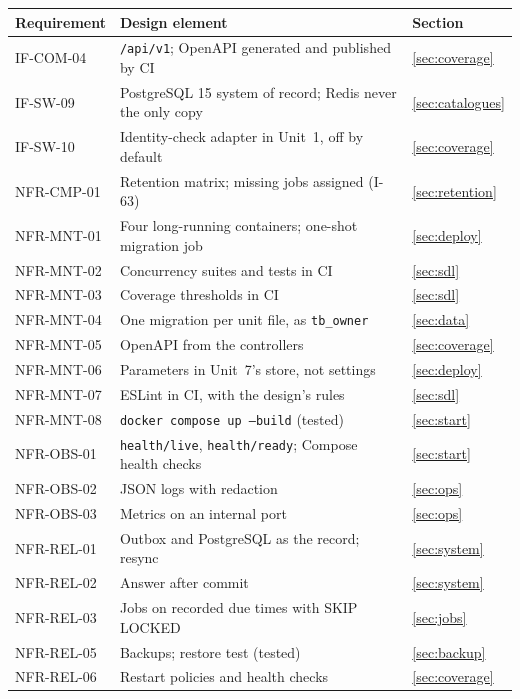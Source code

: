 \documentclass[11pt,a4paper]{article}
\begin{document}
{\small\begin{longtable}{@{}>{\ttfamily}p{2.4cm}>{\raggedright\arraybackslash}p{10.6cm}>{\raggedright\arraybackslash}p{2.2cm}@{}}
\toprule \textnormal{\textbf{Requirement}} & \textbf{Design element} & \textbf{Section} \\ \midrule \endhead
IF-COM-04 & \texttt{/api/v1}; OpenAPI generated and published by CI & \ref{sec:coverage} \\
IF-SW-09 & PostgreSQL 15 system of record; Redis never the only copy & \ref{sec:catalogues} \\
IF-SW-10 & Identity-check adapter in Unit~1, off by default & \ref{sec:coverage} \\
NFR-CMP-01 & Retention matrix; missing jobs assigned (I-63) & \ref{sec:retention} \\
NFR-MNT-01 & Four long-running containers; one-shot migration job & \ref{sec:deploy} \\
NFR-MNT-02 & Concurrency suites and tests in CI & \ref{sec:sdl} \\
NFR-MNT-03 & Coverage thresholds in CI & \ref{sec:sdl} \\
NFR-MNT-04 & One migration per unit file, as \texttt{tb\_owner} & \ref{sec:data} \\
NFR-MNT-05 & OpenAPI from the controllers & \ref{sec:coverage} \\
NFR-MNT-06 & Parameters in Unit~7's store, not settings & \ref{sec:deploy} \\
NFR-MNT-07 & ESLint in CI, with the design's rules & \ref{sec:sdl} \\
NFR-MNT-08 & \texttt{docker compose up --build} (tested) & \ref{sec:start} \\
NFR-OBS-01 & \texttt{health/live}, \texttt{health/ready}; Compose health checks & \ref{sec:start} \\
NFR-OBS-02 & JSON logs with redaction & \ref{sec:ops} \\
NFR-OBS-03 & Metrics on an internal port & \ref{sec:ops} \\
NFR-REL-01 & Outbox and PostgreSQL as the record; resync & \ref{sec:system} \\
NFR-REL-02 & Answer after commit & \ref{sec:system} \\
NFR-REL-03 & Jobs on recorded due times with SKIP LOCKED & \ref{sec:jobs} \\
NFR-REL-05 & Backups; restore test (tested) & \ref{sec:backup} \\
NFR-REL-06 & Restart policies and health checks & \ref{sec:coverage} \\

\end{longtable}}
\end{document}
